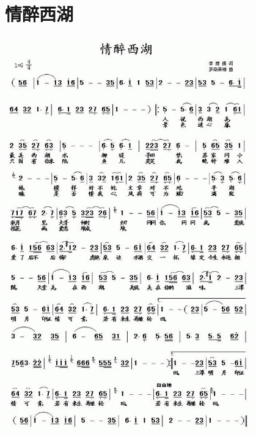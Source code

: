\documentclass[cn,pad,twocol]{elegantbook}
\begin{document}
\section{情醉西湖} \center\includegraphics[width=0.8\textwidth]{dongxiao/20200901-情醉西湖.jpeg}
\end{document}
